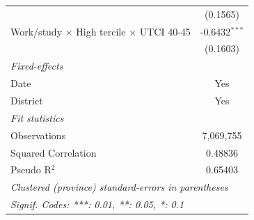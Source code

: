 \begin{table}[htbp]
\begin{tabular}{lc}
                                                                        & (0.1565)\\   
      Work/study $\times$ High tercile $\times$ UTCI 40-45              & -0.6432$^{***}$\\   
                                                                        & (0.1603)\\   
      \midrule
      \emph{Fixed-effects}\\
      Date                                                              & Yes\\  
      District                                                          & Yes\\  
      \midrule
      \emph{Fit statistics}\\
      Observations                                                      & 7,069,755\\  
      Squared Correlation                                               & 0.48836\\  
      Pseudo R$^2$                                                      & 0.65403\\  
      \midrule \midrule
      \multicolumn{2}{l}{\emph{Clustered (province) standard-errors in parentheses}}\\
      \multicolumn{2}{l}{\emph{Signif. Codes: ***: 0.01, **: 0.05, *: 0.1}}\\
   \end{tabular}
\end{table}


